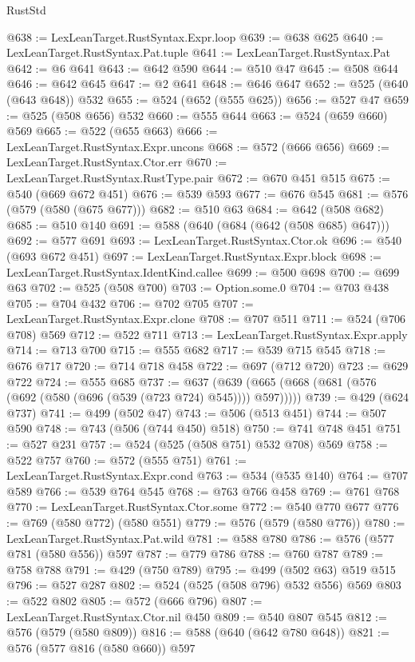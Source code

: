 \begin{lexlean}{RustStd}
\begin{coremodule}
{\begin{coremodule}
{{{{{{{{{{{{{@638 := LexLeanTarget.RustSyntax.Expr.loop
@639 := @638 @625
@640 := LexLeanTarget.RustSyntax.Pat.tuple
@641 := LexLeanTarget.RustSyntax.Pat
@642 := @6 @641
@643 := @642 @590
@644 := @510 @47
@645 := @508 @644
@646 := @642 @645
@647 := @2 @641
@648 := @646 @647
@652 := @525 (@640 (@643 @648)) @532
@655 := @524 (@652 (@555 @625))
@656 := @527 @47
@659 := @525 (@508 @656) @532
@660 := @555 @644
@663 := @524 (@659 @660) @569
@665 := @522 (@655 @663)
@666 := LexLeanTarget.RustSyntax.Expr.uncons
@668 := @572 (@666 @656)
@669 := LexLeanTarget.RustSyntax.Ctor.err
@670 := LexLeanTarget.RustSyntax.RustType.pair
@672 := @670 @451 @515
@675 := @540 (@669 @672 @451)
@676 := @539 @593
@677 := @676 @545
@681 := @576 (@579 (@580 (@675 @677)))
@682 := @510 @63
@684 := @642 (@508 @682)
@685 := @510 @140
@691 := @588 (@640 (@684 (@642 (@508 @685) @647)))
@692 := @577 @691
@693 := LexLeanTarget.RustSyntax.Ctor.ok
@696 := @540 (@693 @672 @451)
@697 := LexLeanTarget.RustSyntax.Expr.block
@698 := LexLeanTarget.RustSyntax.IdentKind.callee
@699 := @500 @698
@700 := @699 @63
@702 := @525 (@508 @700)
@703 := Option.some.{0}
@704 := @703 @438
@705 := @704 @432
@706 := @702 @705
@707 := LexLeanTarget.RustSyntax.Expr.clone
@708 := @707 @511
@711 := @524 (@706 @708) @569
@712 := @522 @711
@713 := LexLeanTarget.RustSyntax.Expr.apply
@714 := @713 @700
@715 := @555 @682
@717 := @539 @715 @545
@718 := @676 @717
@720 := @714 @718 @458
@722 := @697 (@712 @720)
@723 := @629 @722
@724 := @555 @685
@737 := @637 (@639 (@665 (@668 (@681 (@576 (@692 (@580 (@696 (@539 (@723 @724) @545)))) @597)))))
@739 := @429 (@624 @737)
@741 := @499 (@502 @47)
@743 := @506 (@513 @451)
@744 := @507 @590
@748 := @743 (@506 (@744 @450) @518)
@750 := @741 @748 @451
@751 := @527 @231
@757 := @524 (@525 (@508 @751) @532 @708) @569
@758 := @522 @757
@760 := @572 (@555 @751)
@761 := LexLeanTarget.RustSyntax.Expr.cond
@763 := @534 (@535 @140)
@764 := @707 @589
@766 := @539 @764 @545
@768 := @763 @766 @458
@769 := @761 @768
@770 := LexLeanTarget.RustSyntax.Ctor.some
@772 := @540 @770 @677
@776 := @769 (@580 @772) (@580 @551)
@779 := @576 (@579 (@580 @776))
@780 := LexLeanTarget.RustSyntax.Pat.wild
@781 := @588 @780
@786 := @576 (@577 @781 (@580 @556)) @597
@787 := @779 @786
@788 := @760 @787
@789 := @758 @788
@791 := @429 (@750 @789)
@795 := @499 (@502 @63) @519 @515
@796 := @527 @287
@802 := @524 (@525 (@508 @796) @532 @556) @569
@803 := @522 @802
@805 := @572 (@666 @796)
@807 := LexLeanTarget.RustSyntax.Ctor.nil @450
@809 := @540 @807 @545
@812 := @576 (@579 (@580 @809))
@816 := @588 (@640 (@642 @780 @648))
@821 := @576 (@577 @816 (@580 @660)) @597
}}}}}}}}}}}}}
\end{coremodule}}
\end{coremodule}
\end{lexlean}
